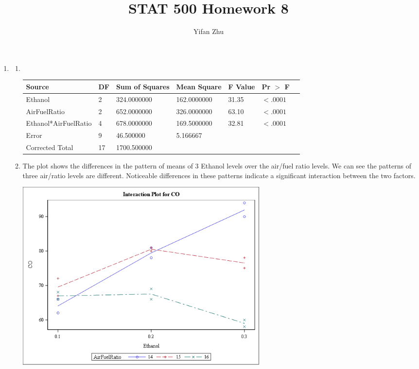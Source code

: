 \documentclass{article}
\begin{document}
	

	
	\title{STAT 500 Homework 8}
	\author{Yifan Zhu}
	\maketitle
	
	\begin{enumerate}[leftmargin = 0 em, label = \arabic*., font = \bfseries]
	\item
	\begin{enumerate}
		\item \
\begin{center}
		\begin{tabular}{lllllll}
		\toprule
		Source&DF&Sum of Squares&Mean Square&F Value&Pr $>$ F\\
		\midrule
Ethanol&2&324.0000000&162.0000000&31.35&$<.0001$\\
AirFuelRatio&2&652.0000000&326.0000000&63.10&$<.0001$\\
Ethanol*AirFuelRatio&4&678.0000000&169.5000000&32.81&$<.0001$\\
Error&9&46.500000&5.166667&&\\
Corrected Total&17&1700.500000&&	\\
\bottomrule
		\end{tabular}
		\end{center}



\item The plot shows the differences in the pattern of means of 3 Ethanol levels over the air/fuel ratio levels. We can see the patterns of three air/ratio levels are different. Noticeable differences in these patterns indicate a significant interaction between the two factors.

\begin{center}
\includegraphics[width = 0.6\textwidth]{interaction.png}
\end{center}


\end{enumerate}
\end{enumerate}
\end{document}
